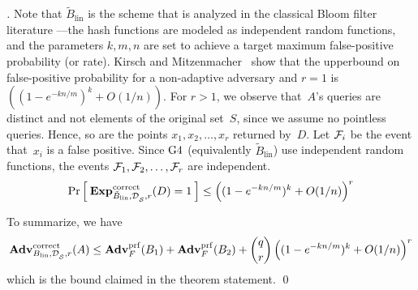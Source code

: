 \begin{proof}[]
Note that $\tilde{B}_{\mathrm{lin}}$ is the scheme that is analyzed in the classical Bloom filter literature ---the hash functions are modeled as independent random functions, and the parameters $k,m,n$  are set to achieve a target maximum false-positive probability (or rate).  Kirsch and Mitzenmacher~\cite{KM} show that the upperbound on false-positive probability for a non-adaptive adversary and $r=1$ is $\left( (1-e^{-kn/m})^k + O(1/n) \right)$.  For $r>1$, we observe that~$A$'s queries are distinct and not elements of the original set~$S$, since we assume no pointless queries. Hence, so are the points $x_1,x_2,\ldots,x_r$ returned by~$D$.  Let ${\cal F}_i$ be the event that~$x_i$ is a false positive.  Since $\text{G4}$ (equivalently $\tilde{B}_{\mathrm{lin}}$) use independent random functions, the events ${\cal F}_1,{\cal F}_2,\ldots,{\cal F}_r$ are independent. 
\[
\Pr\left[\: \mathrm{\mathbf{Exp}}^{\mathrm{correct}}_{\tilde{B}_{\mathrm{lin}},\mathcal{D}_{{\cal S}}^{},r}(D) = 1 \:\right]\leq \left( (1-e^{-kn/m})^k + O(1/n) \right)^r 
\]

To summarize, we have 
\[
\mathrm{\mathbf{Adv}}^{\mathrm{correct}}_{B_{\mathrm{lin}},\mathcal{D}_{{\cal S}}^{},r}(A)  \leq  \mathbf{Adv}^{\mathrm{prf}}_{F}(B_1) +\mathbf{Adv}^{\mathrm{prf}}_{F}(B_2) +\dbinom{q}{r}\left( (1-e^{-kn/m})^k + O(1/n) \right)^r
\]
which is the bound claimed in the theorem statement. \hfill \qed


\end{proof}
